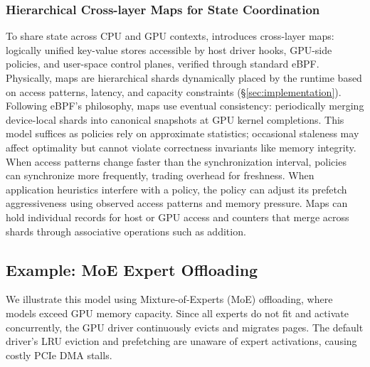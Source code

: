 \subsubsection{Hierarchical Cross-layer Maps for State Coordination}
\label{sec:cross-layer-maps}

To share state across CPU and GPU contexts, \sys{} introduces cross-layer maps: logically unified key-value stores accessible by host driver hooks, GPU-side policies, and user-space control planes, verified through standard eBPF.
Physically, maps are hierarchical shards dynamically placed by the runtime based on access patterns, latency, and capacity constraints (\S\ref{sec:implementation}).
Following eBPF's philosophy, \sys{} maps use eventual consistency: periodically merging device-local shards into canonical snapshots at GPU kernel completions.
This model suffices as policies rely on approximate statistics; occasional staleness may affect optimality but cannot violate correctness invariants like memory integrity.
When access patterns change faster than the synchronization interval, policies can synchronize more frequently, trading overhead for freshness.
When application heuristics interfere with a policy, the policy can adjust its prefetch aggressiveness using observed access patterns and memory pressure.
Maps can hold individual records for host or GPU access and counters that merge across shards through associative operations such as addition.

\subsection{Example: MoE Expert Offloading}

We illustrate this model using Mixture-of-Experts (MoE) offloading, where models exceed GPU memory capacity.
Since all experts do not fit and activate concurrently, the GPU driver continuously evicts and migrates pages.
The default driver's LRU eviction and prefetching are unaware of expert activations, causing costly PCIe DMA stalls.

